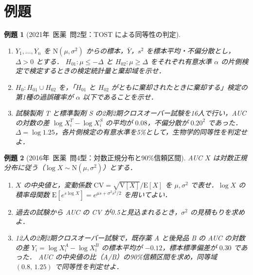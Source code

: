 \documentclass[a4paper,11pt,openany]{ltjsbook}
\newtheorem{reidai}{例題}[chapter]
\newcommand{\kakomon}[2]{\mbox{#1年 医薬 問#2}}
\newcommand{\E}{\mathrm{E}}
\newcommand{\V}{\mathrm{V}}
\newcommand{\Normal}{\mathrm{N}}
\begin{document}
\section{例題}\label{sec:m10-reidai}
\begin{reidai}[\kakomon{2021}{2}型：TOST による同等性の判定]\label{reidai:m10-1}
\begin{enumerate}[label=〔\arabic*〕]
\item $Y_1,\dots,Y_n$ を $\Normal(\mu,\sigma^2)$ からの標本，$\bar Y$，$s^2$ を標本平均・不偏分散とし，$\Delta>0$ とする．
      $H_{01}:\mu\le-\Delta$ と $H_{02}:\mu\ge\Delta$ をそれぞれ有意水準 $\alpha$ の片側検定で検定するときの検定統計量と棄却域を示せ．
\item $H_0:H_{01}\cup H_{02}$ を，「$H_{01}$ と $H_{02}$ がともに棄却されたときに棄却する」検定の第1種の過誤確率が $\alpha$ 以下であることを示せ．
\item 試験製剤 T と標準製剤 S の2剤2期クロスオーバー試験を16人で行い，AUC の対数の差 $\log X_i^T-\log X_i^S$ の平均が $0.08$，不偏分散が $0.20^2$ であった．
      $\Delta=\log1.25$，各片側検定の有意水準を5\%として，生物学的同等性を判定せよ．
\end{enumerate}
\end{reidai}

\begin{reidai}[\kakomon{2016}{4}型：対数正規分布と90\%信頼区間]\label{reidai:m10-2}
AUC $X$ は対数正規分布に従う（$\log X\sim\Normal(\mu,\sigma^2)$）とする．
\begin{enumerate}[label=〔\arabic*〕]
\item $X$ の中央値と，変動係数 $\mathrm{CV}=\sqrt{\V[X]}/\E[X]$ を $\mu,\sigma^2$ で表せ．$\log X$ の積率母関数 $\E[e^{s\log X}]=e^{\mu s+\sigma^2s^2/2}$ を用いてよい．
\item 過去の試験から AUC の CV が0.5と見込まれるとき，$\sigma^2$ の見積もりを求めよ．
\item 12人の2剤2期クロスオーバー試験で，既存薬 A と後発品 B の AUC の対数の差 $Y_i=\log X_i^A-\log X_i^B$ の標本平均が $-0.12$，標本標準偏差が $0.30$ であった．
      AUC の中央値の比（A/B）の90\%信頼区間を求め，同等域 $(0.8,\,1.25)$ で同等性を判定せよ．
\end{enumerate}
\end{reidai}

\end{document}
